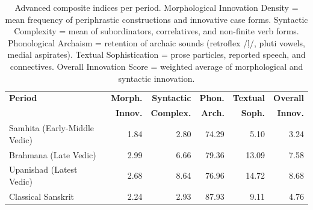 \begin{table}[ht]
\centering
\caption{Advanced composite indices per period. Morphological Innovation Density = mean frequency of periphrastic constructions and innovative case forms. Syntactic Complexity = mean of subordinators, correlatives, and non-finite verb forms. Phonological Archaism = retention of archaic sounds (retroflex /ḷ/, pluti vowels, medial aspirates). Textual Sophistication = prose particles, reported speech, and connectives. Overall Innovation Score = weighted average of morphological and syntactic innovation.}
\label{tab:period-indices}
\begin{tabular}{lrrrrr}
\toprule
\textbf{Period} & \textbf{Morph.} & \textbf{Syntactic} & \textbf{Phon.} & \textbf{Textual} & \textbf{Overall} \\
 & \textbf{Innov.} & \textbf{Complex.} & \textbf{Arch.} & \textbf{Soph.} & \textbf{Innov.} \\
\midrule
Samhita (Early-Middle Vedic) & 1.84 & 2.80 & 74.29 & 5.10 & 3.24 \\
Brahmana (Late Vedic) & 2.99 & 6.66 & 79.36 & 13.09 & 7.58 \\
Upanishad (Latest Vedic) & 2.68 & 8.64 & 76.96 & 14.72 & 8.68 \\
Classical Sanskrit & 2.24 & 2.93 & 87.93 & 9.11 & 4.76 \\
\bottomrule
\end{tabular}
\end{table}